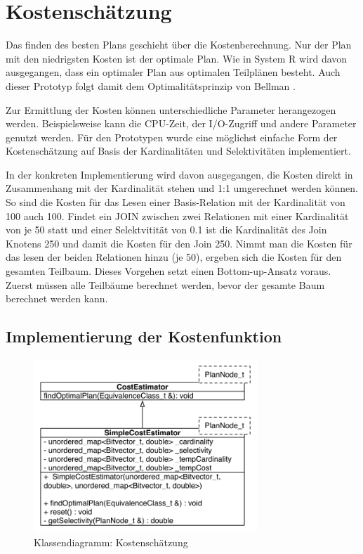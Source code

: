 \section{Kostenschätzung}

Das finden des besten Plans geschieht über die Kostenberechnung. Nur der Plan mit den niedrigsten Kosten ist der optimale Plan. Wie in System R wird davon ausgegangen, dass ein optimaler Plan aus optimalen Teilplänen besteht. Auch dieser Prototyp folgt damit dem Optimalitätsprinzip von Bellman \cite{Bellman:1957}.

Zur Ermittlung der Kosten können unterschiedliche Parameter herangezogen werden. Beispielsweise kann die CPU-Zeit, der I/O-Zugriff und andere Parameter genutzt werden. Für den Prototypen wurde eine möglichst einfache Form der Kostenschätzung auf Basis der Kardinalitäten und Selektivitäten implementiert.

In der konkreten Implementierung wird davon ausgegangen, die Kosten direkt in Zusammenhang mit der Kardinalität stehen und 1:1 umgerechnet werden können. So sind die Kosten für das Lesen einer Basis-Relation mit der Kardinalität von 100 auch 100. Findet ein JOIN zwischen zwei Relationen mit einer Kardinalität von je 50 statt und einer Selektvitität von 0.1 ist die Kardinalität des Join Knotens 250 und damit die Kosten für den Join 250. Nimmt man die Kosten für das lesen der beiden Relationen hinzu (je 50), ergeben sich die Kosten für den gesamten Teilbaum. Dieses Vorgehen setzt einen Bottom-up-Ansatz voraus. Zuerst müssen alle Teilbäume berechnet werden, bevor der gesamte Baum berechnet werden kann.

\subsection{Implementierung der Kostenfunktion}


\begin{figure}[ht]
  \centering
  \includegraphics[width=0.75\textwidth]{04_Implementierung/00_media/ClassCostEstimation.pdf}
  \caption{Klassendiagramm: Kostenschätzung}
  \label{ClassCostEstimation}
\end{figure}



